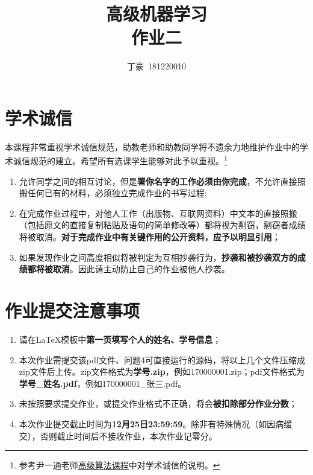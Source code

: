 \documentclass[a4paper,UTF8]{article}
\numberwithin{equation}{section}
\begin{document}
\title{高级机器学习\\
作业二}
\author{丁豪\, 181220010} 
\maketitle

\section*{学术诚信}

本课程非常重视学术诚信规范，助教老师和助教同学将不遗余力地维护作业中的学术诚信规范的建立。希望所有选课学生能够对此予以重视。\footnote{参考尹一通老师\href{http://tcs.nju.edu.cn/wiki/}{高级算法课程}中对学术诚信的说明。}

\begin{tcolorbox}
	\begin{enumerate}
		\item[(1)] 允许同学之间的相互讨论，但是{\color{red}\textbf{署你名字的工作必须由你完成}}，不允许直接照搬任何已有的材料，必须独立完成作业的书写过程;
		\item[(2)] 在完成作业过程中，对他人工作（出版物、互联网资料）中文本的直接照搬（包括原文的直接复制粘贴及语句的简单修改等）都将视为剽窃，剽窃者成绩将被取消。{\color{red}\textbf{对于完成作业中有关键作用的公开资料，应予以明显引用}}；
		\item[(3)] 如果发现作业之间高度相似将被判定为互相抄袭行为，{\color{red}\textbf{抄袭和被抄袭双方的成绩都将被取消}}。因此请主动防止自己的作业被他人抄袭。
	\end{enumerate}
\end{tcolorbox}

\section*{作业提交注意事项}
\begin{tcolorbox}
	\begin{enumerate}
		\item[(1)] 请在LaTeX模板中{\color{red}\textbf{第一页填写个人的姓名、学号信息}}；
		\item[(2)] 本次作业需提交该pdf文件、问题4可直接运行的源码，将以上几个文件压缩成zip文件后上传。zip文件格式为{\color{red}\textbf{学号.zip}}，例如170000001.zip；pdf文件格式为{\color{red}\textbf{学号\_姓名.pdf}}，例如170000001\_张三.pdf。
		\item[(3)] 未按照要求提交作业，或提交作业格式不正确，将会{\color{red}\textbf{被扣除部分作业分数}}；
		\item[(4)] 本次作业提交截止时间为{\color{red}\textbf{12月25日23:59:59}}。除非有特殊情况（如因病缓交），否则截止时间后不接收作业，本次作业记零分。
	\end{enumerate}
\end{tcolorbox}
\end{document}
